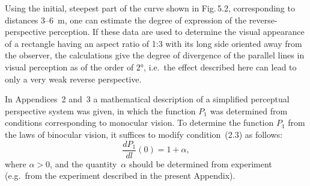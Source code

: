 Using the initial, steepest part of the curve shown in Fig.\,5.2, corresponding to distances
3--6~m, one can estimate the degree of expression of the reverse-perspective perception.
If these data are used to determine the visual appearance of a rectangle having an aspect
ratio of 1:3 with its long side oriented away from the observer, the calculations give the
degree of divergence of the parallel lines in visual perception as of the order of $2°$, i.e.\
the effect described here can lead to only a very weak reverse perspective.


In Appendices~2 and~3 a mathematical description of a simplified perceptual perspective
system was given, in which the function $P_1$ was determined from conditions corresponding
to monocular vision.  To determine the function $P_1$ from the laws of binocular vision,
it suffices to modify condition~(2.3) as follows:
\begin{equation}
  \frac{dP_1}{dl}(0) = 1 + \alpha,  \tag{5.1}
\end{equation}
where $\alpha > 0$, and the quantity~$\alpha$ should be determined from experiment (e.g.\
from the experiment described in the present Appendix).
